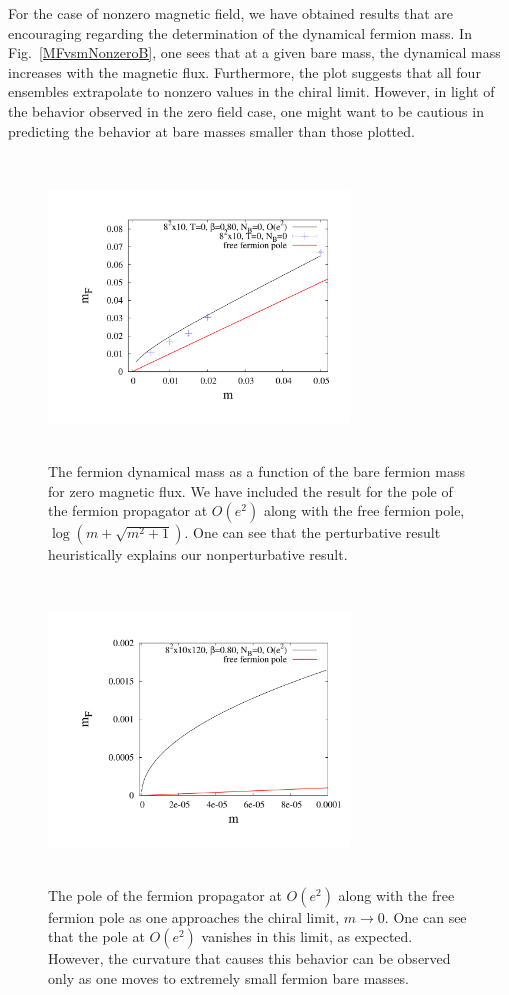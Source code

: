 \documentclass[aps,prd,twocolumn,showpacs,superscriptaddress,groupedaddress]{revtex4}  %
\begin{document}
For the case of nonzero magnetic field, we have obtained results that are encouraging regarding the determination of the dynamical fermion mass. In Fig.~\ref{MFvsmNonzeroB}, one sees that at a given bare mass, the dynamical mass increases with the magnetic flux. Furthermore, the plot suggests that all four ensembles extrapolate to nonzero values in the chiral limit. However, in light of the behavior observed in the zero field case, one might want to be cautious in predicting the behavior at bare masses smaller than those plotted. 

\begin{figure}
  \includegraphics[height=8cm,width=8cm]{ferm_pole_vs_m.pdf} \hspace{-1cm}
\caption{The fermion dynamical mass as a function of the bare fermion mass for zero magnetic flux. We have included the result for the pole of the fermion propagator at $O(e^2)$ along with the free fermion pole, $\log\left(m+\sqrt{m^2+1}\right)$. One can see that the perturbative result heuristically explains our nonperturbative result.}
\label{MFvsmZeroB}
\end{figure}

\begin{figure}
  \includegraphics[height=8cm,width=8cm]{ferm_pole_vs_m_zoom.pdf} \hspace{-1cm}
\caption{The pole of the fermion propagator at $O(e^2)$ along with the free fermion pole as one approaches the chiral limit, $m \to 0$. One can see that the pole at $O(e^2)$ vanishes in this limit, as expected. However, the curvature that causes this behavior can be observed only as one moves to extremely small fermion bare masses.}
\label{MFvsmZeroBZoom}
\end{figure}
\end{document}
